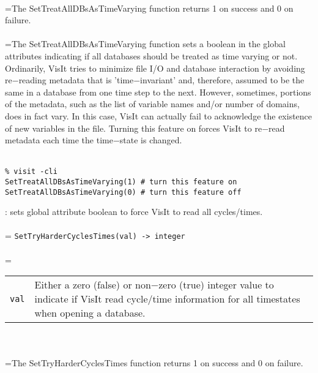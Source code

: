 \documentclass[10pt,a4paper]{report}
\begin{document}
 \\ 
\hangindent=\parindent The SetTreatAllDBsAsTimeVarying function returns 1 on success and 0 on failure. \\[-3mm] 

 \\ 
\hangindent=\parindent The SetTreatAllDBsAsTimeVarying function sets a boolean in the global attributes indicating if all databases should be treated as time varying or not. Ordinarily, VisIt tries to minimize file I/O and database interaction by avoiding re$-$reading metadata that is 'time$-$invariant' and, therefore, assumed to be the same in a database from one time step to the next. However, sometimes, portions of the metadata, such as the list of variable names and/or number of domains, does in fact vary. In this case, VisIt can actually fail to acknowledge the existence of new variables in the file. Turning this feature on forces VisIt to re$-$read metadata each time the time$-$state is changed. \\[-3mm] 

\\[-6mm]
\begin{verbatim}% visit -cli
SetTreatAllDBsAsTimeVarying(1) # turn this feature on
SetTreatAllDBsAsTimeVarying(0) # turn this feature off
\end{verbatim}
\newpage


{}
: sets global attribute boolean to force VisIt to read all cycles/times.\\[-3mm]

 \\ 
\hangindent=\parindent 
\verb!SetTryHarderCyclesTimes(val) -> integer!\\ [-3mm]

 \\ 
\hangindent=\parindent 
\begin{tabular}{lp{9cm}}
\verb!val! & Either a zero (false) or non$-$zero (true) integer value to indicate if VisIt read cycle/time information for all timestates when opening a database. \\
\end{tabular} \\[-2mm]


 \\ 
\hangindent=\parindent The SetTryHarderCyclesTimes function returns 1 on success and 0 on failure. \\[-3mm] 
\end{document}
